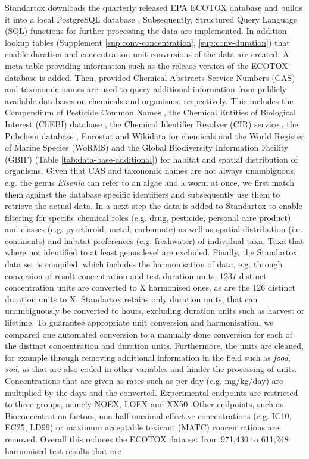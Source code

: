 Standartox downloads the quarterly released EPA ECOTOX database and builds it into a local PostgreSQL database \citep{szocs_build_2019}. Subsequently, Structured Query Language (SQL) functions for further processing the data are implemented. In addition lookup tables (Supplement \ref{sup:conv-concentration}, \ref{sup:conv-duration}) that enable duration and concentration unit conversions of the data are created. A meta table providing information such as the release version of the ECOTOX database is added. Then, provided Chemical Abstracts Service Numbers (CAS) and taxonomic names are used to query additional information from publicly available databases on chemicals and organisms, respectively. This includes the Compendium of Pesticide Common Names \citep{wood_compendium_2019}, the Chemical Entities of Biological Interest (ChEBI) database \citep{hastings_chebi_2016}, the Chemical Identifier Resolver (CIR) service \citep{nationalinstitutesofhealthnih_chemical_2019}, the Pubchem database \citep{kim_pubchem_2016}, Eurostat \citep{europeancommission_eurostat_2019} and Wikidata \citep{vrandecic_wikidata_2014} for chemicals and the World Register of Marine Species (WoRMS) \citep{wormseditorialboard_world_2018} and the Global Biodiversity Information Facility (GBIF) \citep{gbif_gbif_2019} (Table \ref{tab:data-base-additional}) for habitat and spatial distribution of organisms. Given that CAS and taxonomic names are not always unambiguous, e.g. the genus \textit{Eisenia} can refer to an algae and a worm at once, we first match them against the database specific identifiers and subsequently use them to retrieve the actual data. In a next step the data is added to Standartox to enable filtering for specific chemical roles (e.g. drug, pesticide, personal care product) and classes (e.g. pyrethroid, metal, carbamate) as well as spatial distribution (i.e. continents) and habitat preferences (e.g. freshwater) of individual taxa. Taxa that where not identified to at least genus level are excluded. Finally, the Standartox data set is compiled, which includes the harmonisation of data, e.g. through conversion of result concentration and test duration units. 1237 distinct concentration units are converted to X harmonised ones, as are the 126 distinct duration units to X. Standartox retains only duration units, that can unambiguously be converted to hours, excluding duration units such as harvest or lifetime. To guarantee appropriate unit conversion and harmonisation, we compared one automated conversion to a manually done conversion for each of the distinct concentration and duration units. Furthermore, the units are cleaned, for example through removing additional information in the field such as \textit{food}, \textit{soil}, \textit{ai} that are also coded in other variables and hinder the processing of units. Concentrations that are given as rates such as per day (e.g. mg/kg/day) are multiplied by the days and the converted. Experimental endpoints are restricted to three groups, namely NOEX, LOEX and XX50. Other endpoints, such as Bioconcentration factors, non-half maximal effective concentrations (e.g. IC10, EC25, LD99) or maximum acceptable toxicant (MATC) concentrations are removed. Overall this reduces the ECOTOX data set from 971,430 to 611,248 harmonised test results that are 